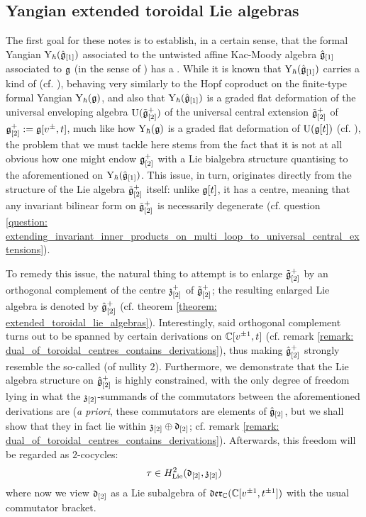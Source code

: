         \subsection{Yangian extended toroidal Lie algebras}
            The first goal for these notes is to establish, in a certain sense, that the formal Yangian $\mathrm{Y}_{\hbar}(\hat{\mathfrak{g}}_{[1]})$ associated to the untwisted affine Kac-Moody algebra $\hat{\mathfrak{g}}_{[1]}$ associated to $\mathfrak{g}$ (in the sense of \cite[Chapter 7]{kac_infinite_dimensional_lie_algebras}) has a . While it is known that $\mathrm{Y}_{\hbar}(\hat{\mathfrak{g}}_{[1]})$ carries a kind of  (cf. \cite{guay_nakajima_wendlandt_affine_yangian_coproduct}), behaving very similarly to the Hopf coproduct on the finite-type formal Yangian $\mathrm{Y}_{\hbar}(\mathfrak{g})$, and also that $\mathrm{Y}_{\hbar}(\hat{\mathfrak{g}}_{[1]})$ is a graded flat deformation of the universal enveloping algebra $\mathrm{U}(\tilde{\mathfrak{g}}_{[2]}^+)$ of the universal central extension $\tilde{\mathfrak{g}}_{[2]}^+$ of $\mathfrak{g}_{[2]}^+ := \mathfrak{g}[v^{\pm}, t]$, much like how $\mathrm{Y}_{\hbar}(\mathfrak{g})$ is a graded flat deformation of $\mathrm{U}(\mathfrak{g}[t])$ (cf. \cite{chari_pressley_quantum_groups}), the problem that we must tackle here stems from the fact that it is not at all obvious how one might endow $\mathfrak{g}_{[2]}^+$ with a Lie bialgebra structure quantising to the aforementioned  on $\mathrm{Y}_{\hbar}(\hat{\mathfrak{g}}_{[1]})$. This issue, in turn, originates directly from the structure of the Lie algebra $\tilde{\mathfrak{g}}_{[2]}^+$ itself: unlike $\mathfrak{g}[t]$, it has a centre, meaning that any invariant bilinear form on $\tilde{\mathfrak{g}}_{[2]}^+$ is necessarily degenerate (cf. question \ref{question: extending_invariant_inner_products_on_multi_loop_to_universal_central_extensions}).

            To remedy this issue, the natural thing to attempt is to enlarge $\tilde{\mathfrak{g}}_{[2]}^+$ by an orthogonal complement of the centre $\mathfrak{z}_{[2]}^+$ of $\tilde{\mathfrak{g}}_{[2]}^+$; the resulting enlarged Lie algebra is denoted by $\hat{\mathfrak{g}}_{[2]}^+$ (cf. theorem \ref{theorem: extended_toroidal_lie_algebras}). Interestingly, said orthogonal complement turns out to be spanned by certain derivations on $\mathbb{C}[v^{\pm 1}, t]$ (cf. remark \ref{remark: dual_of_toroidal_centres_contains_derivations}), thus making $\hat{\mathfrak{g}}_{[2]}^+$ strongly resemble the so-called  (of nullity $2$). Furthermore, we demonstrate that the Lie algebra structure on $\hat{\mathfrak{g}}_{[2]}^+$ is highly constrained, with the only degree of freedom lying in what the $\mathfrak{z}_{[2]}$-summands of the commutators between the aforementioned derivations are (\textit{a priori}, these commutators are elements of $\hat{\mathfrak{g}}_{[2]}$, but we shall show that they in fact lie within $\mathfrak{z}_{[2]} \oplus \mathfrak{d}_{[2]}$; cf. remark \ref{remark: dual_of_toroidal_centres_contains_derivations}). Afterwards, this freedom will be regarded as $2$-cocycles:
                $$\tau \in H^2_{\mathrm{Lie}}(\mathfrak{d}_{[2]}, \mathfrak{z}_{[2]})$$
            where now we view $\mathfrak{d}_{[2]}$ as a Lie subalgebra of $\mathfrak{der}_{\mathbb{C}}(\mathbb{C}[v^{\pm 1}, t^{\pm 1}])$ with the usual commutator bracket. 

